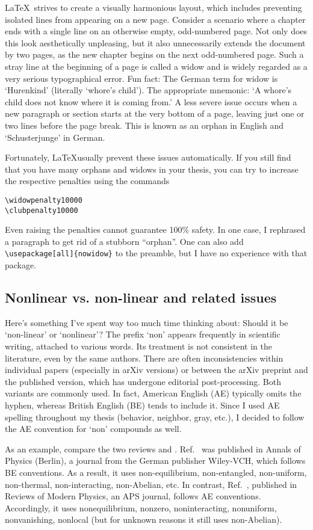 \LaTeX~strives to create a visually harmonious layout, which includes preventing isolated lines from appearing on a new page. Consider a scenario where a chapter ends with a single line on an otherwise empty, odd-numbered page. Not only does this look aesthetically unpleasing, but it also unnecessarily extends the document by two pages, as the new chapter begins on the next odd-numbered page. 
Such a stray line at the beginning of a page is called a widow and is widely regarded as a very serious typographical error. Fun fact: The German term for widow is `Hurenkind' (literally `whore's child'). The appropriate mnemonic: `A whore's child does not know where it is coming from.'
A less severe issue occurs when a new paragraph or section starts at the very bottom of a page, leaving just one or two lines before the page break. This is known as an orphan in English and `Schusterjunge' in German.

Fortunately, \LaTeX usually prevent these issues automatically.
If you still find that you have many orphans and widows in your thesis, you can try to increase the respective penalties using the commands
\begin{lstlisting}
\widowpenalty10000
\clubpenalty10000
\end{lstlisting}
Even raising the penalties cannot guarantee 100\% safety. In one case, I rephrased a paragraph to get rid of a stubborn ``orphan''.
One can also add \verb|\usepackage[all]{nowidow}| to the preamble, but I have no experience with that package.

\subsection{Nonlinear vs. non-linear and related issues}
Here’s something I've spent way too much time thinking about: Should it be `non-linear' or `nonlinear'?
The prefix `non' appears frequently in scientific writing, attached to various words. Its treatment is not consistent in the literature, even by the same authors. There are often inconsistencies within individual papers (especially in arXiv versions) or between the arXiv preprint and the published version, which has undergone editorial post-processing.
Both variants are commonly used. In fact, American English (AE) typically omits the hyphen, whereas British English (BE) tends to include it. Since I used AE spelling throughout my thesis (behavior, neighbor, gray, etc.), I decided to follow the AE convention for `non' compounds as well.

As an example, compare the two reviews \cite{abaninRecentProgressManybody2017} and \cite{abaninColloquiumManybodyLocalization2019}. Ref.~\cite{abaninRecentProgressManybody2017} was published in Annals of Physics (Berlin), a journal from the German publisher Wiley-VCH, which follows BE conventions. As a result, it uses non-equilibrium, non-entangled, non-uniform, non-thermal, non-interacting, non-Abelian, etc. In contrast, Ref.~\cite{abaninColloquiumManybodyLocalization2019}, published in Reviews of Modern Physics, an APS journal, follows AE conventions. Accordingly, it uses nonequilibrium, nonzero, noninteracting, nonuniform, nonvanishing, nonlocal (but for unknown reasons it still uses non-Abelian).

